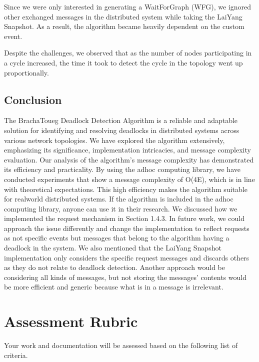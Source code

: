\documentclass[letterpaper,10pt,english]{sphinxmanual}
\begin{document}
\sphinxAtStartPar
Since we were only interested in generating a Wait\sphinxhyphen{}For\sphinxhyphen{}Graph (WFG), we ignored other exchanged messages in the distributed system while taking the Lai\sphinxhyphen{}Yang Snapshot. As a result, the algorithm became heavily dependent on the custom event.

\sphinxAtStartPar
Despite the challenges, we observed that as the number of nodes participating in a cycle increased, the time it took to detect the cycle in the topology went up proportionally.

\sphinxstepscope


\section{Conclusion}
\label{\detokenize{docs/BrachaToueg/conclusion:conclusion}}\label{\detokenize{docs/BrachaToueg/conclusion::doc}}
\sphinxAtStartPar
The Bracha\sphinxhyphen{}Toueg Deadlock Detection Algorithm is a reliable and adaptable solution for identifying and resolving deadlocks in distributed systems across various network topologies. We have explored the algorithm extensively, emphasizing its significance, implementation intricacies, and message complexity evaluation. Our analysis of the algorithm’s message complexity has demonstrated its efficiency and practicality. By using the ad\sphinxhyphen{}hoc computing library, we have conducted experiments that show a message complexity of O(4E), which is in line with theoretical expectations. This high efficiency makes the algorithm suitable for real\sphinxhyphen{}world distributed systems. If the algorithm is included in the ad\sphinxhyphen{}hoc computing library, anyone can use it in their research. We discussed how we implemented the request mechanism in Section 1.4.3. In future work, we could approach the issue differently and change the implementation to reflect requests as not specific events but messages that belong to the algorithm having a deadlock in the system. We also mentioned that the Lai\sphinxhyphen{}Yang Snapshot implementation only considers the specific request messages and discards others as they do not relate to deadlock detection. Another approach would be considering all kinds of messages, but not storing the messages’ contents would be more efficient and generic because what is in a message is irrelevant.

\sphinxstepscope


\chapter{Assessment Rubric}
\label{\detokenize{docs/rubric:assessment-rubric}}\label{\detokenize{docs/rubric::doc}}
\sphinxAtStartPar
Your work and documentation will be assessed based on the following list of criteria.
\end{document}
